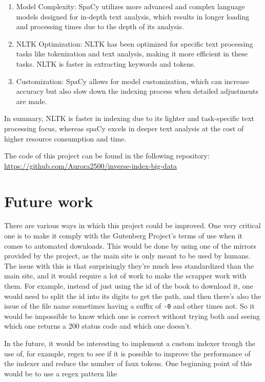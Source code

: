 \documentclass{article}
\begin{document}
\begin{enumerate}
	\item Model Complexity: SpaCy utilizes more advanced and complex language models designed for in-depth text analysis, which results in longer loading and processing times due to the depth of its analysis.
	\item NLTK Optimization: NLTK has been optimized for specific text processing tasks like tokenization and text analysis, making it more efficient in these tasks. NLTK is faster in extracting keywords and tokens.
	\item Customization: SpaCy allows for model customization, which can increase accuracy but also slow down the indexing process when detailed adjustments are made.
\end{enumerate}

In summary, NLTK is faster in indexing due to its lighter and task-specific text processing focus, whereas spaCy excels in deeper text analysis at the cost of higher resource consumption and time.

The code of this project can be found in the following repository: \url{https://github.com/Aurora2500/inverse-index-big-data}

\section{Future work}

There are various ways in which this project could be improved.
One very critical one is to make it comply with the Gutenberg
Project's terms of use when it comes to automated downloads.
This would be done by using one of the mirrors provided by the project,
as the main site is only meant to be used by humans.
The issue with this is that surprisingly they're much less
standardized than the main site, and it would require a lot of work
to make the scrapper work with them.
For example, instead of just using the id of the book to download it,
one would need to split the id into its digits to get the path,
and then there's also the issue of the file name
sometimes having a suffix of \texttt{-0} and other times not.
So it would be impossible to know which one is correct without
trying both and seeing which one returns a 200 status code and which one doesn't.

In the future, it would be interesting to implement
a custom indexer trough the use of, for example, regex
to see if it is possible to improve the performance of the indexer
and reduce the number of faux tokens.
One beginning point of this would be to use a regex pattern like
\end{document}
